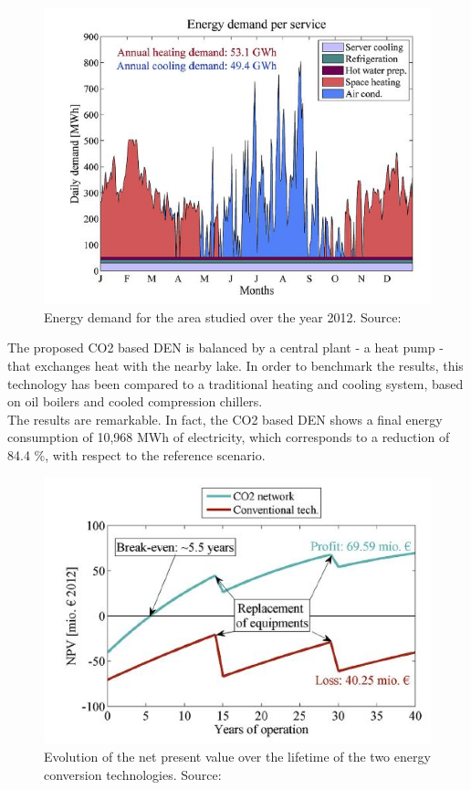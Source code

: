 \documentclass{article}
\begin{document}
\begin{figure}[h!]
\centering
\includegraphics[width=1\textwidth]{henchoz_energydemand.JPG}
\caption{Energy demand for the area studied over the year 2012. Source: \cite{henchozPotentialRefrigerantBased}}
\label{fig:henchoz_energydemand}
\end{figure}

The proposed CO2 based DEN is balanced by a central plant - a heat pump - that exchanges heat with the nearby lake. In order to benchmark the results, this technology has been compared to a traditional heating and cooling system, based on oil boilers and cooled compression chillers.\\
The results are remarkable. In fact, the CO2 based DEN shows a final energy consumption of 10,968 MWh of electricity, which corresponds to a reduction of 84.4 \%, with respect to the reference scenario. 

\begin{figure}[h!]
\centering
\includegraphics[width=1\textwidth]{henchoz_costs.JPG}
\caption{Evolution of the net present value over the lifetime of the two energy conversion technologies. Source: \cite{henchozPotentialRefrigerantBased}}
\label{fig:henchoz_costs}
\end{figure}
\end{document}
